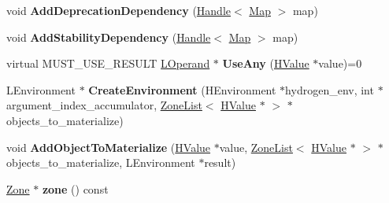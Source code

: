 \begin{DoxyCompactItemize}
\item 
\hypertarget{classv8_1_1internal_1_1_b_a_s_e___e_m_b_e_d_d_e_d_a3f6832ee206ec4389d05c617f239ec95}{}void {\bfseries Add\+Deprecation\+Dependency} (\hyperlink{classv8_1_1internal_1_1_handle}{Handle}$<$ \hyperlink{classv8_1_1internal_1_1_map}{Map} $>$ map)\label{classv8_1_1internal_1_1_b_a_s_e___e_m_b_e_d_d_e_d_a3f6832ee206ec4389d05c617f239ec95}

\item 
\hypertarget{classv8_1_1internal_1_1_b_a_s_e___e_m_b_e_d_d_e_d_a24d34f214a279739a9a70dda07b01c08}{}void {\bfseries Add\+Stability\+Dependency} (\hyperlink{classv8_1_1internal_1_1_handle}{Handle}$<$ \hyperlink{classv8_1_1internal_1_1_map}{Map} $>$ map)\label{classv8_1_1internal_1_1_b_a_s_e___e_m_b_e_d_d_e_d_a24d34f214a279739a9a70dda07b01c08}

\item 
\hypertarget{classv8_1_1internal_1_1_b_a_s_e___e_m_b_e_d_d_e_d_a212065ca2bef70dafb1ae9f62402fe43}{}virtual M\+U\+S\+T\+\_\+\+U\+S\+E\+\_\+\+R\+E\+S\+U\+L\+T \hyperlink{classv8_1_1internal_1_1_l_operand}{L\+Operand} $\ast$ {\bfseries Use\+Any} (\hyperlink{classv8_1_1internal_1_1_h_value}{H\+Value} $\ast$value)=0\label{classv8_1_1internal_1_1_b_a_s_e___e_m_b_e_d_d_e_d_a212065ca2bef70dafb1ae9f62402fe43}

\item 
\hypertarget{classv8_1_1internal_1_1_b_a_s_e___e_m_b_e_d_d_e_d_aede42a20e226c9e2f9eb1efb5190b1e3}{}L\+Environment $\ast$ {\bfseries Create\+Environment} (H\+Environment $\ast$hydrogen\+\_\+env, int $\ast$argument\+\_\+index\+\_\+accumulator, \hyperlink{classv8_1_1internal_1_1_zone_list}{Zone\+List}$<$ \hyperlink{classv8_1_1internal_1_1_h_value}{H\+Value} $\ast$ $>$ $\ast$objects\+\_\+to\+\_\+materialize)\label{classv8_1_1internal_1_1_b_a_s_e___e_m_b_e_d_d_e_d_aede42a20e226c9e2f9eb1efb5190b1e3}

\item 
\hypertarget{classv8_1_1internal_1_1_b_a_s_e___e_m_b_e_d_d_e_d_a2c0d14fbd40e60e47419c7266756bb6e}{}void {\bfseries Add\+Object\+To\+Materialize} (\hyperlink{classv8_1_1internal_1_1_h_value}{H\+Value} $\ast$value, \hyperlink{classv8_1_1internal_1_1_zone_list}{Zone\+List}$<$ \hyperlink{classv8_1_1internal_1_1_h_value}{H\+Value} $\ast$ $>$ $\ast$objects\+\_\+to\+\_\+materialize, L\+Environment $\ast$result)\label{classv8_1_1internal_1_1_b_a_s_e___e_m_b_e_d_d_e_d_a2c0d14fbd40e60e47419c7266756bb6e}

\item 
\hypertarget{classv8_1_1internal_1_1_b_a_s_e___e_m_b_e_d_d_e_d_a406592e627cf3e71a3062ce90f9b75dc}{}\hyperlink{classv8_1_1internal_1_1_zone}{Zone} $\ast$ {\bfseries zone} () const \label{classv8_1_1internal_1_1_b_a_s_e___e_m_b_e_d_d_e_d_a406592e627cf3e71a3062ce90f9b75dc}


\end{DoxyCompactItemize}
